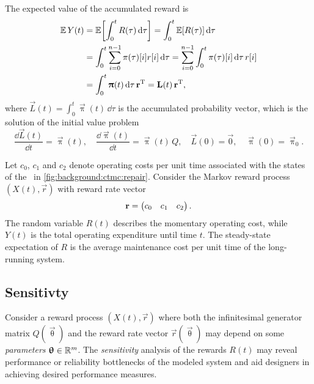 The expected value of the accumulated reward is
\begin{align}
  \Ex Y(t) &= \Ex\mleft[ \int_0^t R(\tau) \,\dd\tau \mright] =
             \int_0^t \Ex[R(\tau)] \,\dd\tau \\
           &= \int_0^t \sum_{i = 0}^{n - 1} \pi(\tau)[i] r[i]
             \,\dd\tau = \sum_{i = 0}^{n - 1} \int_0^t \pi(\tau)[i]
             \,\dd\tau \, r[i] \\
           &= \int_0^t \vec{\uppi}(t) \,\dd\tau \, \vec{r}^\T =
             \vec{L}(t) \, \vec{r}^\T \text,
\end{align}
where $\vec{L}(t) = \int_0^t \vec{\uppi}(t) \,\dd\tau$ is the accumulated
probability vector, which is the solution of the initial value problem
\begin{equation}
  \frac{\dd \vec{L}(t)}{\dd t} = \vec{\uppi}(t), \quad \frac{\dd
    \vec{\uppi}(t)}{\dd t} = \vec{\uppi}(t) \, Q, \quad
  \vec{L}(0) = \vec{0}, \quad \vec{\uppi}(0) = \vec{\uppi}_0.
\end{equation}

\begin{example}
  Let $c_0$, $c_1$ and $c_2$ denote operating costs per unit time
  associated with the states of the \CTMC\ in
  \cref{fig:background:ctmc:repair}. Consider the Markov reward
  process $(X(t), \vec{r})$ with reward rate vector
  \begin{equation}
    \vec{r} = \begin{pmatrix} c_0 & c_1 & c_2 \end{pmatrix} \text.
  \end{equation}
  The random variable $R(t)$ describes the momentary operating cost,
  while $Y(t)$ is the total operating expenditure until time $t$. The
  steady-state expectation of $R$ is the average maintenance cost per
  unit time of the long-running system.
\end{example}

\subsection{Sensitivty}

Consider a reward process $(X(t), \vec{r})$ where both the
infinitesimal generator matrix $Q(\vec{\uptheta})$ and the reward rate
vector $\vec{r}(\vec{\uptheta})$ may depend on some \emph{parameters}
$\vec{\uptheta} \in \RR^m$. The \emph{sensitivity} analysis of the
rewards $R(t)$ may reveal performance or reliability bottlenecks of
the modeled system and aid designers in achieving desired performance
measures.

